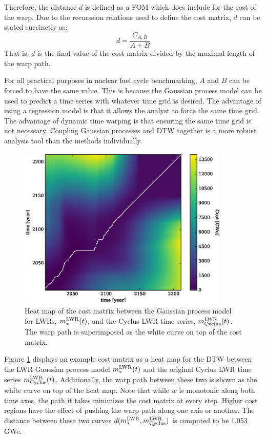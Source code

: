 Therefore, the distance $d$ is defined as a FOM which does include for the cost of the
warp.  Due to the recurssion relations used to define the cost matrix, $d$ can be 
stated succinctly as:
\begin{equation}
\label{d-calc}
d = \frac{C_{A,B}}{A + B}
\end{equation}
That is, $d$ is the final value of the cost matrix divided by the maximal length 
of the warp path.

For all practical purposes in nuclear fuel cycle benchmarking, $A$ and $B$ can be 
forced to have the same
value. This is because the Gaussian process model can be used to predict a time series 
with whatever time grid is desired.  The advantage of using a regression model 
is that it allows the analyst to force the same time grid.  The advantage of 
dynamic time warping is that ensuring the same time grid is not necessary.
Coupling Gaussian processes and DTW together is a more robust analysis tool 
than the methods individually.

\begin{figure}[htb]
\centering
\includegraphics[width=0.9\textwidth]{cost-lwr-model-to-lwr-cyclus.eps}
\caption{Heat map of the cost matrix between the Gaussian process model 
for LWRs, $m_*^{\mathrm{LWR}}(t)$, and the Cyclus LWR time series, $m_{\mathrm{Cyclus}}^{\mathrm{LWR}}(t)$.
The warp path is superimposed as the white curve on top of the cost matrix.}
\label{cost-lwr-model-to-lwr-cyclus}
\end{figure}

Figure \ref{cost-lwr-model-to-lwr-cyclus} displays an example cost matrix 
as a heat map for the DTW between the LWR Gaussian process model 
$m_*^{\mathrm{LWR}}(t)$ and the original Cyclus LWR time series $m_{\mathrm{Cyclus}}^{\mathrm{LWR}}(t)$.
Additionally, the warp path between these two is shown as the white curve
on top of the heat map. Note that while $w$ is monotonic along both time axes, the
path it takes minimizes the cost matrix at every step. Higher cost regions
have the effect of pushing the warp path along one axis or another. The 
distance between these two curves $d(m_*^{\mathrm{LWR}}, m_{\mathrm{Cyclus}}^{\mathrm{LWR}})$ is computed 
to be 1.053 GWe.

